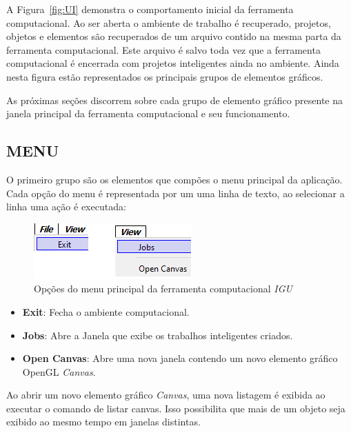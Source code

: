 A Figura~\ref{fig:UI} demonstra o comportamento inicial da ferramenta computacional. Ao ser aberta o ambiente de trabalho é recuperado, projetos, objetos e elementos são recuperados de um arquivo contido na mesma parta da ferramenta computacional. Este arquivo é salvo toda vez que a ferramenta computacional é encerrada com projetos inteligentes ainda no ambiente. Ainda nesta figura estão representados os principais grupos de elementos gráficos.

As próximas seções discorrem sobre cada grupo de elemento gráfico presente na janela principal da ferramenta computacional e seu funcionamento.

\subsection{MENU}\label{sec:menu}

O primeiro grupo são os elementos que compões o menu principal da aplicação. Cada opção do menu é representada por um uma linha de texto, ao selecionar a linha uma ação é executada:

\begin{figure}[!htbp]
	\centering
	\includegraphics[scale=1]{Figures/IGU_016.png}
	\caption{Opções do menu principal da ferramenta computacional \textit{IGU}}
	\label{fig:menu}
\end{figure}


\begin{itemize}
	\item \textbf{Exit}: Fecha o ambiente computacional.
	\item \textbf{Jobs}: Abre a Janela que exibe os trabalhos inteligentes criados.
	\item \textbf{Open Canvas}: Abre uma nova janela contendo um novo elemento gráfico OpenGL \textit{Canvas}.
\end{itemize}

Ao abrir um novo elemento gráfico \textit{Canvas}, uma nova listagem é exibida ao executar o comando de listar canvas. Isso possibilita que mais de um objeto seja exibido ao mesmo tempo em janelas distintas.

